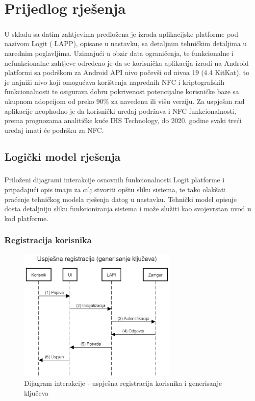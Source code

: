 \chapter{Prijedlog rješenja}
\paragraph*{}
U skladu sa datim zahtjevima predložena je izrada aplikacijske platforme pod nazivom Logit (
\gls{LAPP}), opisane u nastavku, sa detaljnim tehničkim detaljima u narednim poglavljima. Uzimajući u obzir data ograničenja, te funkcionalne i nefunkcionalne zahtjeve određeno je da se korisnička aplikacija izradi na Android platformi sa podrškom za Android API nivo počevši od nivoa 19 (4.4 KitKat), to je najniži nivo koji omogućava korištenja naprednih NFC i kriptografskih funkcionalnosti te osigurava dobru pokrivenost potencijalne korisničke baze sa ukupnom adopcijom od preko 90\% za navedenu ili višu verziju\cite{droidstats}. Za uspješan rad aplikacije neophodno je da korisnički uređaj podržava i NFC funkcionalnosti, prema prognozama analitičke kuće IHS Technology, do 2020. godine svaki treći uređaj imati će podršku za NFC.\cite{nfcforecast}

\section{Logički model rješenja}
\paragraph*{}
Priloženi dijagrami interakcije osnovnih funkcionalnosti Logit platforme i pripadajući opis imaju za cilj stvoriti opštu sliku sistema, te tako olakšati praćenje tehničkog modela rješenja datog u nastavku. Tehnički model opisuje dosta detaljniju sliku funkcioniranja sistema i može služiti kao svojevrstan uvod u kod platforme.

\subsection*{Registracija korisnika}
\begin{figure}[H]
    \centering
    \includegraphics[width=0.7\textwidth]{material/dia/01_registracija}
    \caption{Dijagram interakcije - uspješna registracija korisnika i generisanje ključeva}
\end{figure}
